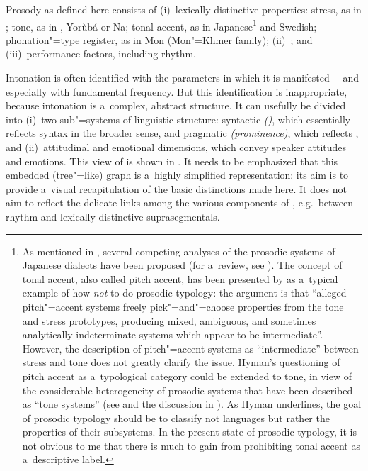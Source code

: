 Prosody as defined here consists of (i)~lexically distinctive properties: stress, as in
; tone, as in , Yorùbá or Na; tonal accent, as in Japanese\footnote{As mentioned in , several competing analyses of the prosodic systems of {Japanese} dialects have been proposed (for a~review, see \citealt{kawahara2015}). The concept of tonal accent, also called pitch accent, has been presented by \citet{hymanhownot2009} as a~typical example of how \textit{not} to do prosodic typology: the argument is that “alleged pitch"=accent systems freely pick"=and"=choose properties from the tone and stress prototypes, producing mixed, ambiguous, and sometimes analytically indeterminate systems which appear to be intermediate”. However, the description of pitch"=accent systems as “intermediate” between stress and tone does not greatly clarify the issue. Hyman's questioning of pitch accent as a~typological category could be extended to tone, in view of the considerable heterogeneity of prosodic systems that have been described as “tone systems” (see \citealt{brunelleetal2016} and the discussion
	 in ). As Hyman underlines, the goal of prosodic typology should be to classify not languages but rather the properties of their subsystems. In the present state of prosodic typology, it is not obvious to me that there is much to gain from prohibiting tonal accent as a~descriptive label.} and Swedish;
phonation"=type register, as in Mon (Mon"=Khmer family); (ii)~; and (iii)~performance
factors, including rhythm.

Intonation is often identified with the parameters in which
it is manifested~-- and especially with fundamental frequency. But this identification is inappropriate, because intonation is a~complex, abstract
structure. It can usefully be divided into (i)~two sub"=systems of linguistic structure: syntactic
 \textit{()}, which essentially reflects syntax in the broader sense, and pragmatic
 \textit{(prominence)}, which reflects , and (ii)~attitudinal and emotional
dimensions, which convey speaker attitudes and emotions. This view of  is shown in . It needs to be emphasized that this embedded (tree"=like) graph is a~highly simplified representation: its aim is to provide a~visual recapitulation of the basic distinctions made here. It does not aim to reflect the delicate links among the various components of , e.g.~between rhythm and lexically distinctive suprasegmentals.

